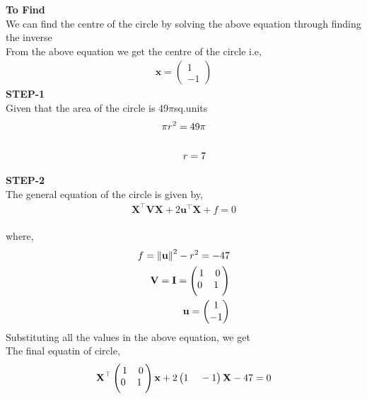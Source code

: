 \documentclass[10pt,a4paper]{report}
\newcommand{\myvec}[1]{\ensuremath{\begin{pmatrix}#1\end{pmatrix}}}
\let\vec\mathbf
\providecommand{\norm}[1]{\left\lVert#1\right\rVert}
\let\vec\mathbf
\begin{document}
\begin{multicols}{2}
\textbf{To Find }\vspace{2mm}\\
We can find the centre of the circle by solving the above equation through finding the inverse \vspace{2mm}  \\ 
From the above equation we get the centre of the circle i.e, \\\vspace{1mm}
\begin{align}
    \vec{x} =
    \myvec{
    1\\
    -1
    }
\end{align}
\textbf{STEP-1}\vspace{2mm}\\
Given that the area of the circle is 49$\pi$sq.units \\ \vspace{1mm}
\begin{align}
    \pi{r^2} = 49\pi
    \\ \vspace{1mm}
    \\
    {r} = 7
\end{align}

\textbf{STEP-2}\vspace{2mm}\\
The general equation of the circle is given by,\\ \vspace{1mm}
\begin{align}
    \textbf{X}^\top \textbf{V}\textbf{X}+2\textbf{u}^\top\textbf{X}+{f} = 0
\end{align}
\\
where, \\ \vspace{1mm}
\begin{align}
	f = \vec{\norm{u}}^2-{r}^2 = -47\\
    \textbf{V}=\vec{I}=\myvec{
    1 \hspace{4mm} 0 \\ \vspace{1mm}
    0 \hspace{4mm} 1 \
    }
    \\ \vspace{1mm}
    \textbf{u}=\myvec{
    {1}
    \\
    {-1}
    }
\end{align}
Substituting all the values in the above equation, we get \\
The final equatin of circle,
\begin{align}
    \textbf{X}^\top \myvec{
    1 \hspace{4mm} 0 \\ \vspace{1mm}
    0 \hspace{4mm} 1 \
    }
    \textbf{x}+2\myvec{
    1
    \hspace{4mm}
    -1
    }\textbf{X} - 47 = 0
\end{align}

\end{multicols}
\end{document}
